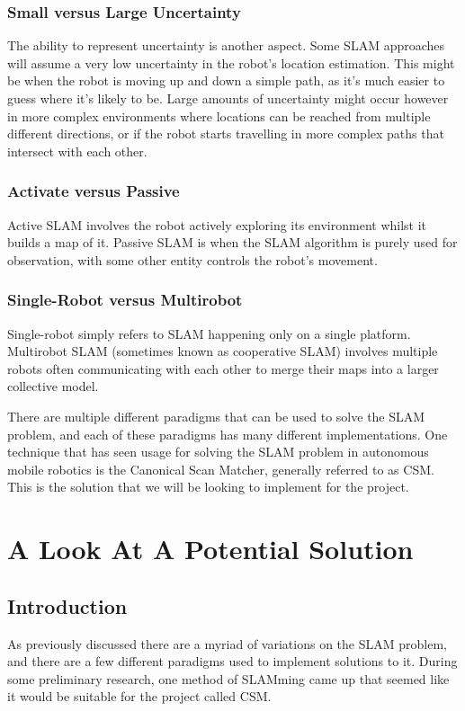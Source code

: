 					\subsubsection{Small versus Large Uncertainty}
					The ability to represent uncertainty is another aspect. Some SLAM approaches will assume a very low uncertainty in the robot's location estimation. This might be when the robot is moving up and down a simple path, as it's much easier to guess where it's likely to be. Large amounts of uncertainty might occur however in more complex environments where locations can be reached from multiple different directions, or if the robot starts travelling in more complex paths that intersect with each other.
					
					
					\subsubsection{Activate versus Passive}
					Active SLAM involves the robot actively exploring its environment whilst it builds a map of it. Passive SLAM is when the SLAM algorithm is purely used for observation, with some other entity controls the robot's movement. 
					
					\subsubsection{Single-Robot versus Multirobot}
					Single-robot simply refers to SLAM happening only on a single platform. Multirobot SLAM (sometimes known as cooperative SLAM) involves multiple robots often communicating with each other to merge their maps into a larger collective model. 
				
					\medskip
					There are multiple different paradigms that can be used to solve the SLAM problem, and each of these paradigms has many different implementations. One technique that has seen usage for solving the SLAM problem in autonomous mobile robotics is the Canonical Scan Matcher, generally referred to as CSM. This is the solution that we will be looking to implement for the project.

			\section{A Look At A Potential Solution}
				\subsection{Introduction}
				As previously discussed there are a myriad of variations on the SLAM problem, and there are a few different paradigms used to implement solutions to it. During some preliminary research, one method of SLAMming came up that seemed like it would be suitable for the project called CSM.
				
